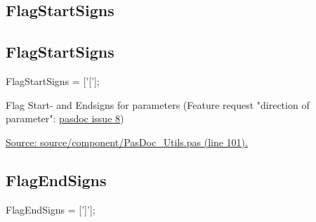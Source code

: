 \documentclass{report}
\newif\ifpdf
\begin{document}
\subsection*{\large{\textbf{FlagStartSigns}}\normalsize\hspace{1ex}\hrulefill}
\else
\subsection*{FlagStartSigns}
\fi
\label{PasDoc_Utils-FlagStartSigns}
\begin{list}{}{
\setlength{\itemindent}{0cm}
\setlength{\listparindent}{0cm}
\setlength{\leftmargin}{\evensidemargin}
\addtolength{\leftmargin}{\tmplength}
\settowidth{\labelsep}{X}
\addtolength{\leftmargin}{\labelsep}
\setlength{\labelwidth}{\tmplength}
}
\item[\textbf{Declaration}\hfill]
\ifpdf
\begin{flushleft}
\fi
\begin{ttfamily}
FlagStartSigns = ['['];\end{ttfamily}

\ifpdf
\end{flushleft}
\fi

\par
\item[\textbf{Description}]
Flag Start{-} and Endsigns for parameters (Feature request "direction of parameter": \href{https://github.com/pasdoc/pasdoc/issues/8}{pasdoc issue 8})\par
\href{https://github.com/pasdoc/pasdoc/blob/master/source/component/PasDoc_Utils.pas#L101}{Source: source/component/PasDoc{\_}Utils.pas (line 101).}

\end{list}
\ifpdf
\subsection*{\large{\textbf{FlagEndSigns}}\normalsize\hspace{1ex}\hrulefill}
\else
\subsection*{FlagEndSigns}
\fi
\label{PasDoc_Utils-FlagEndSigns}
\begin{list}{}{
\setlength{\itemindent}{0cm}
\setlength{\listparindent}{0cm}
\setlength{\leftmargin}{\evensidemargin}
\addtolength{\leftmargin}{\tmplength}
\settowidth{\labelsep}{X}
\addtolength{\leftmargin}{\labelsep}
\setlength{\labelwidth}{\tmplength}
}
\item[\textbf{Declaration}\hfill]
\ifpdf
\begin{flushleft}
\fi
\begin{ttfamily}
FlagEndSigns = [']'];\end{ttfamily}

\ifpdf
\end{flushleft}
\fi

\end{list}
\end{document}
